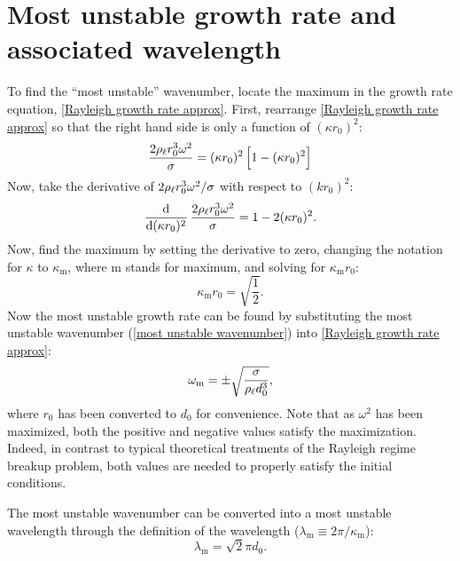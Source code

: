 \section{Most unstable growth rate and associated wavelength}

To find the ``most unstable'' wavenumber, locate the maximum in the growth rate equation, \eqref{Rayleigh growth rate approx}. First, rearrange \eqref{Rayleigh growth rate approx} so that the right hand side is only a function of $(\kappa r_0)^2$:
\begin{equation}
   \frac{2 \rho_{\ell} r_0^3 \omega^2}{\sigma} = (\kappa r_0)^2 \left[1 - (\kappa r_0)^2\right]
\end{equation}
Now, take the derivative of $2 \rho_{\ell} r_0^3 \omega^2 / \sigma$ with respect to $(k r_0)^2$:
\begin{equation}
   \dod{}{{(\kappa r_0)^2}} \frac{2 \rhol r_0^3 \omega^2}{\sigma} = 1 - 2 (\kappa r_0)^2.
\end{equation}
Now, find the maximum by setting the derivative to zero, changing the notation for $\kappa$ to $\kappa_\text{m}$, where m stands for maximum, and solving for $\kappa_\text{m} r_0$:
\begin{equation}
   \kappa_\text{m} r_0 = \sqrt{\frac{1}{2}}. \label{eqn:most unstable wavenumber}
\end{equation}
Now the most unstable growth rate can be found by substituting the most unstable wavenumber (\eqref{most unstable wavenumber}) into \eqref{Rayleigh growth rate approx}:
\begin{equation}
   \omega_\text{m} = \pm \sqrt{\frac{\sigma}{\rho_{\ell} d_0^3}}, \label{eqn:most unstable growth rate}
\end{equation}
where $r_0$ has been converted to $d_0$ for convenience. Note that as $\omega^2$ has been maximized, both the positive and negative values satisfy the maximization. Indeed, in contrast to typical theoretical treatments of the Rayleigh regime breakup problem, both values are needed to properly satisfy the initial conditions.

The most unstable wavenumber can be converted into a most unstable wavelength through the definition of the wavelength ($\lambda_\text{m} \equiv 2 \pi / \kappa_\text{m}$):
\begin{equation}
   \lambda_\text{m} = \sqrt{2} \pi d_0. \label{eqn:most unstable wavelength}
\end{equation}

